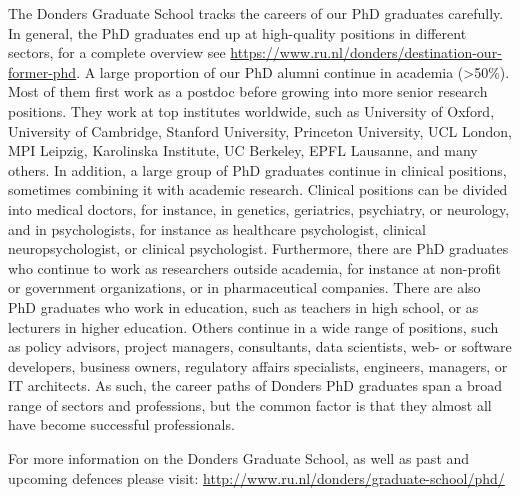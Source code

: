 The Donders Graduate School tracks the careers of our PhD graduates carefully. In general, the PhD graduates end up at high-quality positions in different sectors, for a complete overview see \url{https://www.ru.nl/donders/destination-our-former-phd}. A large proportion of our PhD alumni continue in academia (>50\%). Most of them first work as a postdoc before growing into more senior research positions. They work at top institutes worldwide, such as University of Oxford, University of Cambridge, Stanford University, Princeton University, UCL London, MPI Leipzig, Karolinska Institute, UC Berkeley, EPFL Lausanne, and many others. In addition, a large group of PhD graduates continue in clinical positions, sometimes combining it with academic research. Clinical positions can be divided into medical doctors, for instance, in genetics, geriatrics, psychiatry, or neurology, and in psychologists, for instance as healthcare psychologist, clinical neuropsychologist, or clinical psychologist. Furthermore, there are PhD graduates who continue to work as researchers outside academia, for instance at non-profit or government organizations, or in pharmaceutical companies. There are also PhD graduates who work in education, such as teachers in high school, or as lecturers in higher education. Others continue in a wide range of positions, such as policy advisors, project managers, consultants, data scientists, web- or software developers, business owners, regulatory affairs specialists, engineers, managers, or IT architects. As such, the career paths of Donders PhD graduates span a broad range of sectors and professions, but the common factor is that they almost all have become successful professionals.

For more information on the Donders Graduate School, as well as past and upcoming defences please visit: \url{http://www.ru.nl/donders/graduate-school/phd/}